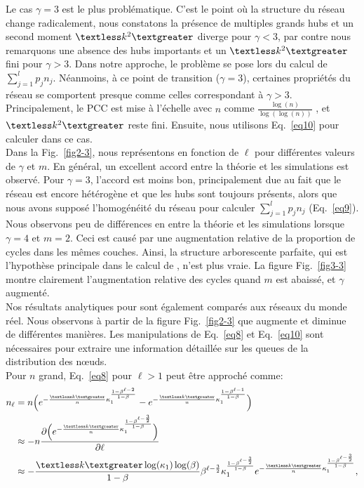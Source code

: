Le cas $\gamma=3$ est le plus problématique. C'est le point où la structure du réseau change radicalement, nous constatons la présence de multiples grands hubs et un second moment  $\textless k^2 \textgreater$ diverge pour $\gamma<3$, par contre nous remarquons une absence des hubs importants et un $\textless k^2  \textgreater$ fini pour $\gamma>3$.
Dans notre approche, le problème se pose lors du calcul de $\sum_{j=1}^{l}p_jn_j$. Néanmoins, à ce point de transition ($\gamma=3$), certaines propriétés du réseau se comportent presque comme celles correspondant à $\gamma>3$.
Principalement, le PCC est mise à l'échelle avec $n$ comme $\frac {\log(n)}{\log(\log(n))}$ \cite{Bollobas-Riordan2004}, et $\textless k^2  \textgreater$ reste fini. Ensuite, nous utilisons Eq.~\eqref{eq10} pour calculer \nl dans ce cas. \\
Dans la Fig.~\ref{fig2-3}, nous représentons \nl en fonction de $\ell$ pour différentes valeurs de $\gamma$ et $m$. En général, un excellent accord entre la théorie et les simulations est observé. Pour $\gamma=3$, l'accord est moins bon, principalement due au fait que le réseau est encore hétérogène et que les hubs sont toujours présents, alors que nous avons supposé l'homogénéité du réseau pour calculer $\sum_{j=1}^{l} p_jn_j$ (Eq.~\eqref{eq9}). Nous observons peu de différences en \nl entre la théorie et les simulations lorsque $ \gamma = 4 $ et $ m = 2 $. Ceci est causé par une augmentation relative de la proportion de cycles dans les mêmes couches. Ainsi, la structure arborescente parfaite, qui est l'hypothèse principale dans le calcul de \nl, n'est plus vraie. La figure Fig.~\ref{fig3-3} montre clairement l'augmentation relative des cycles quand $ m $ est abaissé, et $ \gamma $ augmenté.\\
Nos résultats analytiques pour \nl sont également comparés aux réseaux du monde réel. Nous observons à partir de la figure Fig.~\ref{fig2-3} que \nl augmente et diminue de différentes manières. Les manipulations de Eq.~\eqref{eq8} et Eq.~\eqref {eq10} sont nécessaires pour extraire une information détaillée sur les queues de la distribution des nœuds. \\ Pour $n$ grand, Eq.~\eqref{eq8} pour $\ell>1$ peut être approché comme:
\begin{align}
n_{\ell}&=n\Big(e^{-\frac{\km}{n}\kappa_1^{\frac{1-\beta^{\ell-2}}{1-\beta}}}-e^{-\frac{\km}{n}\kappa_1^{\frac{1-\beta^{\ell-1}}{1-\beta}}}\Big) \nonumber \\
&\approx -n \frac{\partial \Big(e^{-\frac{\km}{n}\kappa_1^{\frac{1-\beta^{\ell-\frac{3}{2}}}{1-\beta}}} \Big) }{\partial \ell} \nonumber \\
&\approx -\frac {\km \log(\kappa_1) \log(\beta)} {1-\beta} \beta^{\ell-\frac{3}{2}} \kappa_1^{\frac{1-\beta^{\ell-\frac{3}{2}}}{1-\beta}}e^{-\frac{\km}{n}\kappa_1^{\frac{1-\beta^{\ell-\frac{3}{2}}}{1-\beta}}}, 
\label{eq11}
\end{align}
